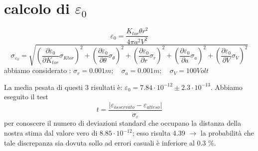 \documentclass[a4paper]{article}
\theoremstyle{definition}
\begin{document}
\section*{calcolo di \(\varepsilon_{0}\)}
\[\varepsilon_{0}= \frac{K_{tor}\theta r^{2}}{4\pi a^{2}V^{2}}\]
\[\sigma_{\varepsilon_{0}} = \sqrt{\left ( \frac{\partial \varepsilon _{0}}{\partial K_{tor}} \sigma _{Ktor}\right )^{2} + \left ( \frac{\partial \varepsilon _{0}}{\partial \theta} \sigma _{\theta}\right )^{2} + \left ( \frac{\partial \varepsilon _{0}}{\partial r} \sigma _{r}\right )^{2} + \left ( \frac{\partial \varepsilon _{0}}{\partial a} \sigma _{a}\right )^{2} + \left ( \frac{\partial \varepsilon _{0}}{\partial V} \sigma _{V}\right )^{2}}\]
abbiamo considerato : \( \sigma_{r} = 0.001m; \quad   \sigma_{a} = 0.001m; \quad \sigma_{V} = 100 Volt\)


\begin{figure}[!htbp]
\end{figure}

\noindent La media pesata di questi 3 risultati è: \(\varepsilon_{0} = 7.84 \cdot 10^{-12}\pm  2.3 \cdot 10^{-13}\). Abbiamo eseguito il test \[ t=\frac{\left | \varepsilon_{osservato}-\varepsilon_{atteso} \right |}{\sigma _{\varepsilon}}\] per conoscere il numero di deviazioni standard che occupano la distanza della nostra stima dal valore vero di \(8.85 \cdot 10^{-12}\); esso risulta 4.39 \(\rightarrow \) la probabilità che tale discrepanza sia dovuta sollo ad errori casuali è inferiore al 0.3 \(\%\).
\end{document}

